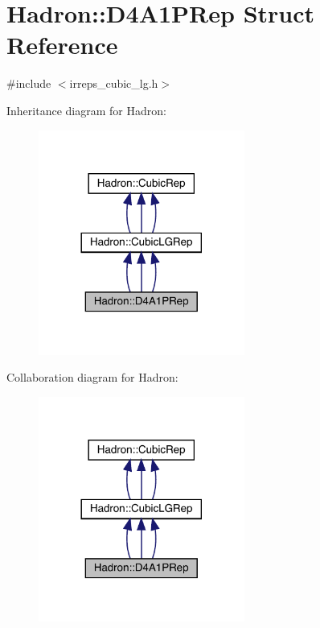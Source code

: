 \hypertarget{structHadron_1_1D4A1PRep}{}\section{Hadron\+:\+:D4\+A1\+P\+Rep Struct Reference}
\label{structHadron_1_1D4A1PRep}


{\ttfamily \#include $<$irreps\+\_\+cubic\+\_\+lg.\+h$>$}



Inheritance diagram for Hadron\+:
\nopagebreak
\begin{figure}[H]
\begin{center}
\leavevmode
\includegraphics[width=192pt]{d3/dd0/structHadron_1_1D4A1PRep__inherit__graph}
\end{center}
\end{figure}


Collaboration diagram for Hadron\+:
\nopagebreak
\begin{figure}[H]
\begin{center}
\leavevmode
\includegraphics[width=192pt]{d1/da2/structHadron_1_1D4A1PRep__coll__graph}
\end{center}
\end{figure}
